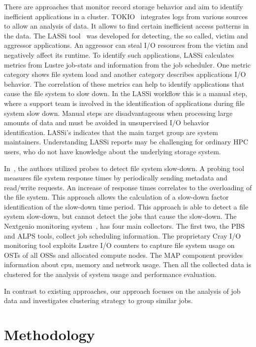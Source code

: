 \documentclass[]{llncs}
\begin{document}
There are approaches that monitor record storage behavior and aim to identify inefficient applications in a cluster.
TOKIO~\cite{lockwood2018tokio} integrates logs from various sources to allow an analysis of data. 
It allows to find certain inefficient access patterns in the data.
The LASSi tool~\cite{DBLP:journals/corr/abs-1906-03884} was developed for detecting, the so called, victim and aggressor applications.
An aggressor can steal I/O resources from the victim and negatively affect its runtime.
To identify such applications, LASSi calculates metrics from Lustre job-stats and information from the job scheduler.
One metric category shows file system load and another category describes applications I/O behavior.
The correlation of these metrics can help to identify applications that cause the file system to slow down.
In the LASSi workflow this is a manual step, where a support team is involved in the identification of applications during file system slow down.
Manual steps are disadvantageous when processing large amounts of data and must be avoided in unsupervised I/O behavior identification.
LASSi's indicates that the main target group are system maintainers.
Understanding LASSi reports may be challenging for ordinary HPC users, who do not have knowledge about the underlying storage system.

In~\cite{TUISVPKB19}, the authors utilized probes to detect file system slow-down.
A probing tool measures file system response times by periodically sending metadata and read/write requests.
An increase of response times correlates to the overloading of the file system.
This approach allows the calculation of a slow-down factor identification of the slow-down time period.
This approach is able to detect a file system slow-down, but cannot detect the jobs that cause the slow-down.
The Nextgenio monitoring system~\cite{nextgenio2016}, has four main collectors.
The first two, the PBS and ALPS tools, collect job scheduling information.
The proprietary Cray I/O monitoring tool exploits Lustre I/O counters to capture file system usage on OSTs of all OSSs and allocated compute nodes.
The MAP component provides information about cpu, memory and network usage.
Then all the collected data is clustered for the analysis of system usage and performance evaluation.

In contrast to existing approaches, our approach focuses on the analysis of job data and investigates clustering strategy to group similar jobs.

\section{Methodology}
\end{document}
